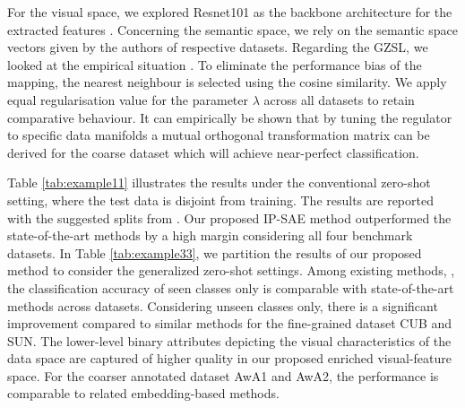 \documentclass{article}
\begin{document}
For the visual space, we explored Resnet101 as the backbone architecture for the extracted features \cite{b56}. Concerning the semantic space, we rely on the semantic space vectors given by the authors of respective datasets. Regarding the GZSL, we looked at the empirical situation \cite{b57}. To eliminate the performance bias of the mapping, the nearest neighbour is selected using the cosine similarity. We apply equal regularisation value for the parameter $\lambda$ across all datasets to retain comparative behaviour. It can empirically be shown that by tuning the regulator to specific data manifolds a mutual orthogonal transformation matrix can be derived for the coarse dataset which will achieve near-perfect classification. 

Table \ref{tab:example11} illustrates the results under the conventional zero-shot setting, where the test data is disjoint from training. The results are reported with the suggested splits from \cite{b56}. Our proposed IP-SAE method outperformed the state-of-the-art methods by a high margin considering all four benchmark datasets.  In Table \ref{tab:example33}, we partition the results of our proposed method to consider the generalized zero-shot settings. Among existing methods, \cite{b56}, the classification accuracy of seen classes only is comparable with state-of-the-art methods across datasets. Considering unseen classes only, there is a significant improvement compared to similar methods for the fine-grained dataset CUB and SUN. The lower-level binary attributes depicting the visual characteristics of the data space are captured of higher quality in our proposed enriched visual-feature space. For the coarser annotated dataset AwA1 and AwA2, the performance is comparable to related embedding-based methods.
\end{document}
